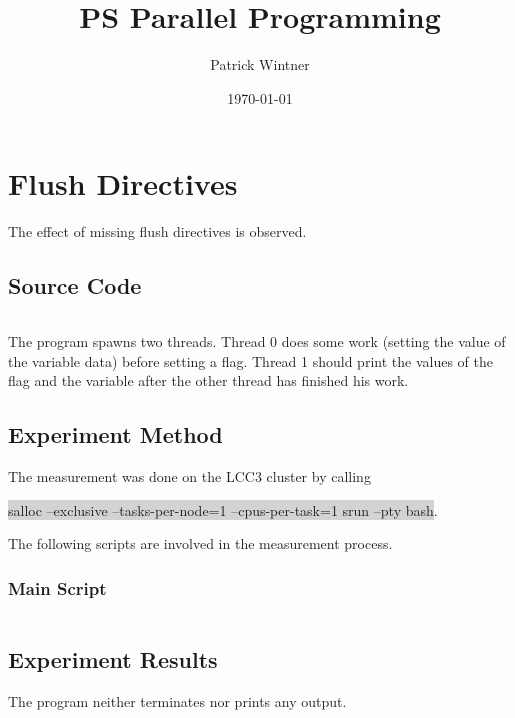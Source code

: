 \documentclass[parskip]{scrartcl}
\title{PS Parallel Programming}
\author{Patrick Wintner}
\date{\today}
\begin{document}
	\maketitle
	
	\section{Flush Directives}
	The effect of missing flush directives is observed.
	\subsection{Source Code}
	\inputminted	[linenos]{c}{ex1/ex1.c}
	
	The program spawns two threads. Thread 0 does some  work (setting the value of the variable data) before setting a flag. Thread 1 should print the values of the flag and the variable after the other thread has finished his work.
	
	\subsection{Experiment Method}
	The measurement was done on the LCC3 cluster by calling 
	\begin{center}
		\colorbox{lightgray}{salloc --exclusive --tasks-per-node=1 --cpus-per-task=1 srun --pty bash}.
	\end{center} 
	The following scripts are involved in the measurement process.
	\subsubsection{Main Script}
	\inputminted[linenos]{bash}{ex1/main.sh}
	
	\subsection{Experiment Results}
	The program neither terminates nor prints any output.
\end{document}
